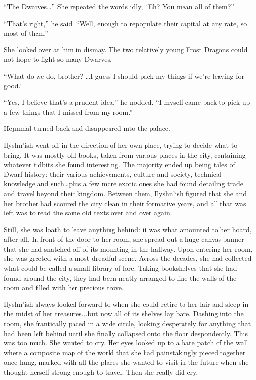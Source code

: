 

“The Dwarves…” She repeated the words idly, “Eh? You mean all of them?”

 

“That’s right,” he said. “Well, enough to repopulate their capital at any rate, so most of them.”

 

She looked over at him in dismay. The two relatively young Frost Dragons could not hope to fight so many Dwarves.

 

“What do we do, brother? …I guess I should pack my things if we’re leaving for good.”

 

“Yes, I believe that’s a prudent idea,” he nodded. “I myself came back to pick up a few things that I missed from my room.”

 

Hejinmal turned back and disappeared into the palace.

 

Ilyshn’ish went off in the direction of her own place, trying to decide what to bring. It was mostly old books, taken from various places in the city, containing whatever tidbits she found interesting. The majority ended up being tales of Dwarf history: their various achievements, culture and society, technical knowledge and such…plus a few more exotic ones she had found detailing trade and travel beyond their kingdom. Between them, Ilyshn’ish figured that she and her brother had scoured the city clean in their formative years, and all that was left was to read the same old texts over and over again.

 

Still, she was loath to leave anything behind: it was what amounted to her hoard, after all. In front of the door to her room, she spread out a huge canvas banner that she had snatched off of its mounting in the hallway. Upon entering her room, she was greeted with a most dreadful scene. Across the decades, she had collected what could be called a small library of lore. Taking bookshelves that she had found around the city, they had been neatly arranged to line the walls of the room and filled with her precious trove.

 

Ilyshn’ish always looked forward to when she could retire to her lair and sleep in the midst of her treasures...but now all of its shelves lay bare. Dashing into the room, she frantically paced in a wide circle, looking desperately for anything that had been left behind until she finally collapsed onto the floor despondently. This was too much. She wanted to cry. Her eyes looked up to a bare patch of the wall where a composite map of the world that she had painstakingly pieced together once hung, marked with all the places she wanted to visit in the future when she thought herself strong enough to travel. Then she really did cry.

